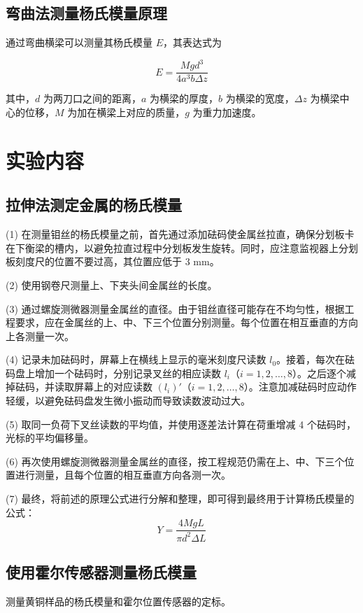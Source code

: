 \documentclass[UTF-8,twoside,cs4size]{ctexart}
\begin{document}
\subsection{弯曲法测量杨氏模量原理}
通过弯曲横梁可以测量其杨氏模量 $E$，其表达式为

\begin{equation}
    E = \frac{M g d^3}{4 a^3 b \Delta z}
\end{equation}

其中，$d$ 为两刀口之间的距离，$a$ 为横梁的厚度，$b$ 为横梁的宽度，$\Delta z$ 为横梁中心的位移，$M$ 为加在横梁上对应的质量，$g$ 为重力加速度。

\section{实验内容}
\subsection{拉伸法测定金属的杨氏模量}

(1) 在测量钼丝的杨氏模量之前，首先通过添加砝码使金属丝拉直，确保分划板卡在下衡梁的槽内，以避免拉直过程中分划板发生旋转。同时，应注意监视器上分划板刻度尺的位置不要过高，其位置应低于 3 mm。

(2) 使用钢卷尺测量上、下夹头间金属丝的长度。

(3) 通过螺旋测微器测量金属丝的直径。由于钼丝直径可能存在不均匀性，根据工程要求，应在金属丝的上、中、下三个位置分别测量。每个位置在相互垂直的方向上各测量一次。

(4) 记录未加砝码时，屏幕上在横线上显示的毫米刻度尺读数 $l_0$。接着，每次在砝码盘上增加一个砝码时，分别记录叉丝的相应读数 $l_i$（$i = 1, 2, \dots, 8$）。之后逐个减掉砝码，并读取屏幕上的对应读数 $(l_i)'$（$i = 1, 2, \dots, 8$）。注意加减砝码时应动作轻缓，以避免砝码盘发生微小振动而导致读数波动过大。

(5) 取同一负荷下叉丝读数的平均值，并使用逐差法计算在荷重增减 4 个砝码时，光标的平均偏移量。

(6) 再次使用螺旋测微器测量金属丝的直径，按工程规范仍需在上、中、下三个位置进行测量，且每个位置的相互垂直方向各测一次。

(7) 最终，将前述的原理公式进行分解和整理，即可得到最终用于计算杨氏模量的公式：
\begin{equation}
    Y = \frac{4 M g L}{\pi d^2 \Delta L}
\end{equation}

\subsection{使用霍尔传感器测量杨氏模量}
测量黄铜样品的杨氏模量和霍尔位置传感器的定标。
\end{document}

